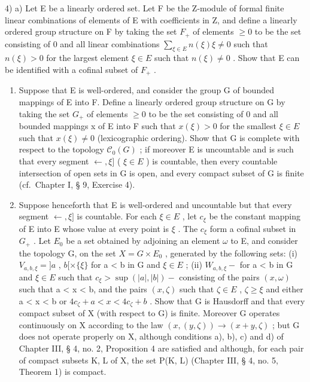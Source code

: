 4) a) Let E be a linearly ordered set. Let F be the Z-module of formal finite linear combinations of elements of E with coefficients in Z, and define a linearly ordered group structure on F by taking the set \(F_{+}\) of elements \(\geqslant 0\) to be the set consisting of 0 and all linear combinations \(\sum_{\xi \in E} n(\xi) \xi \neq 0\) such that \(n(\xi) > 0\) for the largest element \(\xi \in E\) such that \(n(\xi) \neq 0\) . Show that E can be identified with a cofinal subset of \(F_{+}\) .

\begin{enumerate}
\def\labelenumi{\alph{enumi})}
\setcounter{enumi}{1}
\item
  Suppose that E is well-ordered, and consider the group G of bounded mappings of E into F. Define a linearly ordered group structure on G by taking the set \(G_{+}\) of elements \(\geqslant0\) to be the set consisting of 0 and all bounded mappings x of E into F such that \(x(\xi)>0\) for the smallest \(\xi\in E\) such that \(x(\xi)\neq0\) (lexicographic ordering). Show that G is complete with respect to the topology \(\mathcal{C}_{0}(G)\) ; if moreover E is uncountable and is such that every segment \(\leftarrow,\xi]\) ( \(\xi\in E\) ) is countable, then every countable intersection of open sets in G is open, and every compact subset of G is finite (cf.~Chapter I, § 9, Exercise 4).
\item
  Suppose henceforth that E is well-ordered and uncountable but that every segment \(\leftarrow,\xi]\) is countable. For each \(\xi\in E\) , let \(c_{\xi}\) be the constant mapping of E into E whose value at every point is \(\xi\) . The \(c_{\xi}\) form a cofinal subset in \(G_{+}\) . Let \(E_{0}\) be a set obtained by adjoining an element \(\omega\) to E, and consider the topology G, on the set \(X=G\times E_{0}\) , generated by the following sets: (i) \(V_{a,b,\xi} = ]a\) , \(b[\times\{\xi\}\) for a \textless{} b in G and \(\xi\in E\) ; (ii) \(W_{a,b,\xi} -\) for a \textless{} b in G and \(\xi\in E\) such that \(c_{\xi} > \sup(|a|, |b|) -\) consisting of the pairs \((x, \omega)\) such that a \textless{} x \textless{} b, and the pairs \((x, \zeta)\) such that \(\zeta\in E\) , \(\zeta \geqslant \xi\) and either a \textless{} x \textless{} b or \(4c_{\zeta} + a < x < 4c_{\zeta} + b\) . Show that G is Hausdorff and that every compact subset of X (with respect to G) is finite. Moreover G operates continuously on X according to the law \((x, (y, \zeta)) \to (x + y, \zeta)\) ; but G does not operate properly on X, although conditions a), b), c) and d) of Chapter III, § 4, no. 2, Proposition 4 are satisfied and although, for each pair of compact subsets K, L of X, the set P(K, L) (Chapter III, § 4, no. 5, Theorem 1) is compact.
\end{enumerate}
